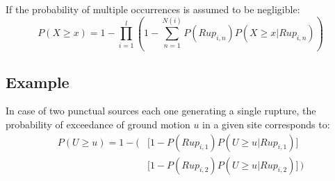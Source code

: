 If the probability of multiple occurrences is assumed to be negligible:
%
\begin{equation}
P(X\geq x)=1-\prod\limits_{i=1}^{l} 
	\left( 
		1-\sum\limits_{n=1}^{N(i)}P(Rup_{i,n})P(X\geq x|Rup_{i,n})
	\right)
\end{equation}

\subsection{Example}
In case of two punctual sources each one generating a single rupture, the 
probability of exceedance of ground motion $u$ in a given site corresponds to:
%
\begin{eqnarray}
P(U\geq u)=
	1-
	\biggl(& 
		\bigl[ 1-P(Rup_{i,1})P(U\geq u|Rup_{i,1}) \bigr] \nonumber \\
		& \bigl[ 1-P(Rup_{i,2})P(U\geq u|Rup_{i,2}) \bigr]
	\,\biggr)
\end{eqnarray}